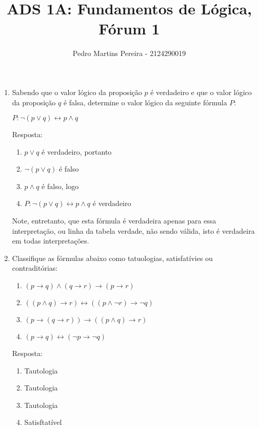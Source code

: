 \documentclass[11pt]{article}
\date{}
\begin{document}
\author{Pedro Martins Pereira - 2124290019}
\title{ADS 1A: Fundamentos de Lógica, Fórum 1}
\maketitle

\medskip

\begin{enumerate}

\item
	Sabendo que o valor lógico da proposição $p$ é verdadeiro e que o valor lógico da proposição $q$ é falsa, determine o valor lógico da seguinte fórmula $P$:

	$P: \neg(p \vee q) \leftrightarrow p \wedge q$

	Resposta:

	\begin{enumerate}[label=(\roman*)]
  		\item $p \vee q$ é verdadeiro, portanto
  		\item $\neg(p \vee q)$ é falso
  		\item $p\wedge q$ é falso, logo 
		\item $P: \neg(p \vee q) \leftrightarrow p \wedge q$ é verdadeiro
	\end{enumerate}

	Note, entretanto, que esta fórmula é verdadeira apenas para essa interpretação, ou linha da tabela verdade, não sendo válida, isto é verdadeira em todas interpretações.

\item
	Classifique as fórmulas abaixo como tatuologias, satisfatívies ou contraditórias:
	\begin{enumerate}[label=(\alph*)]
  		\item $(p \rightarrow q) \wedge (q \rightarrow r) \rightarrow (p \rightarrow r)$ 
  		\item $((p \wedge q)\rightarrow r) \leftrightarrow ((p \wedge \neg r)\rightarrow \neg q)$
  		\item $(p \rightarrow(q \rightarrow r))\rightarrow ((p \wedge q)\rightarrow r)$
  		\item $(p \rightarrow q) \leftrightarrow (\neg p \rightarrow \neg q)$
	\end{enumerate}

	Resposta:

	\begin{enumerate}[label=(\alph*)]
  		\item Tautologia 
  		\item Tautologia
  		\item Tautologia 
  		\item Satisftatível
	\end{enumerate}


\end{enumerate}
\end{document}
